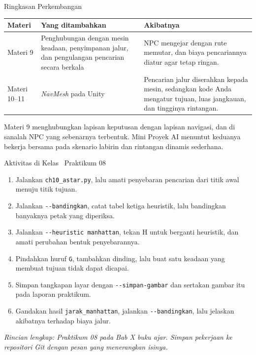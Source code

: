 \documentclass[aspectratio=169,10pt]{beamer}
\begin{document}
\begin{frame}{Ringkasan Perkembangan}
{\scriptsize
\renewcommand{\arraystretch}{1.14}
\begin{tabularx}{\textwidth}{@{}>{\centering\arraybackslash}p{1.8cm}
    >{\raggedright\arraybackslash}p{5.2cm} X@{}}
\toprule
\textbf{Materi} & \textbf{Yang ditambahkan} & \textbf{Akibatnya} \\
\midrule
Materi 9 & Penghubungan dengan mesin keadaan, penyimpanan jalur, dan
pengulangan pencarian secara berkala &
NPC mengejar dengan rute memutar, dan biaya pencariannya diatur agar tetap
ringan. \\
Materi 10--11 & \emph{NavMesh} pada Unity &
Pencarian jalur diserahkan kepada mesin, sedangkan kode Anda mengatur tujuan,
luas jangkauan, dan tingginya rintangan. \\
\bottomrule
\end{tabularx}}
\vspace{0.16cm}
\begin{kotak}
Materi 9 menghubungkan lapisan keputusan dengan lapisan navigasi, dan di
sanalah NPC yang sebenarnya terbentuk. Mini Proyek AI menuntut keduanya bekerja
bersama pada skenario labirin dan rintangan dinamis sederhana.
\end{kotak}
\end{frame}

\begin{frame}{Aktivitas di Kelas \textperiodcentered\ Praktikum 08}
\begin{enumerate}
  \item Jalankan \texttt{ch10\_astar.py}, lalu amati penyebaran pencarian dari
        titik awal menuju titik tujuan.
  \item Jalankan \texttt{-{}-bandingkan}, catat tabel ketiga heuristik, lalu
        bandingkan banyaknya petak yang diperiksa.
  \item Jalankan \texttt{-{}-heuristic manhattan}, tekan H untuk berganti
        heuristik, dan amati perubahan bentuk penyebarannya.
  \item Pindahkan huruf \texttt{G}, tambahkan dinding, lalu buat satu keadaan
        yang membuat tujuan tidak dapat dicapai.
  \item Simpan tangkapan layar dengan \texttt{-{}-simpan-gambar} dan sertakan
        gambar itu pada laporan praktikum.
  \item Gandakan hasil \texttt{jarak\_manhattan}, jalankan
        \texttt{-{}-bandingkan}, lalu jelaskan akibatnya terhadap biaya jalur.
\end{enumerate}
\vspace{0.10cm}
{\footnotesize\color{ubAccent}\itshape Rincian lengkap: Praktikum 08 pada Bab X
buku ajar. Simpan pekerjaan ke repositori Git dengan pesan yang menerangkan
isinya.}
\end{frame}
\end{document}
